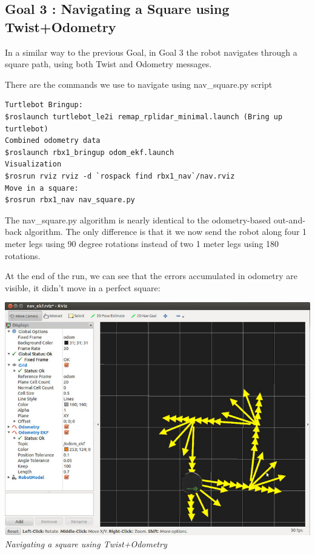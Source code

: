 \documentclass[10pt,a4paper]{article}
\begin{document}
\subsection{Goal 3 : Navigating a Square using Twist+Odometry}
In a similar way to the previous Goal, in Goal 3 the robot navigates through a square path, using both Twist and Odometry messages.

There are the commands we use to navigate using nav\_square.py script

\begin{lstlisting}[frame=single]
Turtlebot Bringup:
$roslaunch turtlebot_le2i remap_rplidar_minimal.launch (Bring up turtlebot)
Combined odometry data
$roslaunch rbx1_bringup odom_ekf.launch
Visualization
$rosrun rviz rviz -d `rospack find rbx1_nav`/nav.rviz
Move in a square:
$rosrun rbx1_nav nav_square.py
\end{lstlisting}

The nav\_square.py algorithm is nearly identical to the odometry-based out-and-back algorithm. The only difference is that it we now send the robot along four 1 meter legs using 90 degree rotations instead of two 1 meter legs using 180 rotations.

At the end of the run, we can see that the errors accumulated in odometry are visible, it didn't move in a perfect square:

\begin{center}
\includegraphics[width=\textwidth]{images/square_py.jpg}\\
\textit{Navigating a square using Twist+Odometry}
\end{center}
\end{document}
